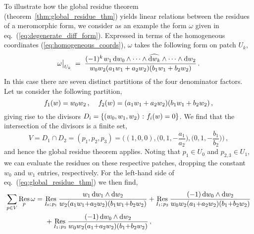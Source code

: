 \documentclass[dvipsnames,preprint,12pt,sort&compress]{elsarticle}
\def\d{{\rm d}}
\begin{document}
To illustrate how the global residue theorem (theorem~\ref{thm:global_residue_thm})
yields linear relations between the residues of a meromorphic form,
we consider as an example the form $\omega$ given in eq.~(\ref{eq:degenerate_diff_form}).
Expressed in terms of the homogeneous coordinates (\ref{eq:homogeneous_coords}),
$\omega$ takes the following form on patch $U_k$,
\begin{align}
\omega \big|_{U_k} \hspace{1mm}=\hspace{1mm}
\frac{(-1)^k \hspace{0.4mm} w_1 \hspace{0.6mm}
\d w_0 \wedge \cdots \wedge \widehat{\d w_k} \wedge \cdots \wedge \d w_2}
{w_0 w_2 (a_1 w_1 + a_2 w_2)(b_1 w_1 + b_2 w_2)} \,.
\end{align}
In this case there are seven distinct partitions of the
four denominator factors. Let us consider the following partition,
\begin{equation}
f_1(w) = w_0 w_2 \,, \hspace{4mm} f_2(w) = (a_1 w_1 + a_2 w_2)(b_1 w_1 + b_2 w_2) \,,
\end{equation}
giving rise to the divisors $D_i = \{(w_0, w_1, w_2) \hspace{0.3mm} : \hspace{0.3mm} f_i(w) = 0\}$.
We find that the intersection of the divisors is a finite set,
\begin{equation}
V = D_1 \cap D_2 = (p_1, p_2, p_3) = \Big( (1,0,0), \big(0,1,-\textstyle{\frac{a_1}{a_2}}\big),
\big(0,1,-\textstyle{\frac{b_1}{b_2}}\big)\Big) \,,
\end{equation}
and hence the global residue theorem applies. Noting that $p_1 \in U_0$ and $p_{2,3} \in U_1$,
we can evaluate the residues on these respective patches, dropping the constant $w_0$ and
$w_1$ entries, respectively. For the left-hand side of eq.~(\ref{eq:global_residue_thm}) we then find,
\begin{align}
\sum_{p \in V} \mathop{\mathrm{Res}}_{p} \omega &=
\mathop{\mathrm{Res}}_{I_0; \hspace{0.3mm} p_1} \frac{w_1 \hspace{0.6mm} \d w_1\wedge \d w_2}
{w_2 (a_1 w_1 {+} a_2 w_2)(b_1 w_1 {+} b_2 w_2)} +
\mathop{\mathrm{Res}}_{I_1; \hspace{0.3mm} p_2} \frac{(-1) \hspace{0.6mm}
\d w_0\wedge \d w_2}{w_0 w_2 (a_1 {+} a_2 w_2)(b_1 {+} b_2 w_2)} \nonumber \\
& \hspace{5mm} + \mathop{\mathrm{Res}}_{I_1; \hspace{0.3mm} p_3} \frac{(-1) \hspace{0.6mm}
\d w_0\wedge \d w_2}{w_0 w_2 (a_1 {+} a_2 w_2)(b_1 {+} b_2 w_2)} \,,
\end{align}
\end{document}
